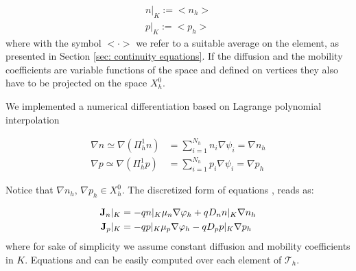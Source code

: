  \begin{align*}
 n|_K := <n_h> \\ 
p|_K := <p_h>
 \end{align*}
where with the symbol $<\cdot >$ we refer to a suitable average on the element, as presented in Section \ref{sec: continuity equations}. If the diffusion and the mobility coefficients are variable functions of the space and defined on vertices they also have to be projected on the space $X_h^0$.

We implemented a numerical differentiation based on Lagrange polynomial interpolation

\begin{align*}
\nabla n \simeq \nabla (\Pi^1_h n) & = \sum_{i=1}^{N_h} n_i \nabla \psi_i = \nabla n_h \\
\nabla p \simeq \nabla (\Pi^1_h p) & = \sum_{i=1}^{N_h} p_i \nabla \psi_i = \nabla p_h
\end{align*}
 
Notice that $\nabla n_h, \, \nabla p_h \in X_h^0$.
The discretized form of equations ,  reads as:

\begin{align}
\mathbf{J}_n|_K &= -qn|_K\mu_n\nabla \varphi_h + qD_n n|_K\nabla n_h \label{eq: Jn DD discrete}\\ 
\mathbf{J}_p|_K &= -qp|_K\mu_p\nabla \varphi_h - qD_p p|_K \nabla p_h \label{eq: Jp DD discrete} 
\end{align}
where for sake of simplicity we assume constant diffusion and mobility coefficients in $K$.
Equations  and  can be easily computed over each element of $\mathcal{T}_h$.

%
%
%
%
 

